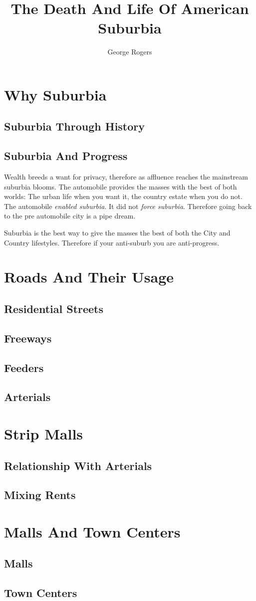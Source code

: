 \documentclass[8pt]{amsbook}
\title{The Death And Life Of American Suburbia}
\author{George Rogers}
\begin{document}
\dominitoc
\maketitle

\tableofcontents
\chapter{Why Suburbia}
\minitoc
\section{Suburbia Through History}
\section{Suburbia And Progress}
Wealth breeds a want for privacy,
therefore as affluence reaches the mainstream suburbia blooms.
The automobile provides the masses with the best of both worlds:
The urban life when you want it, the country estate when you do not.
The automobile \emph{enabled suburbia}. It did not \emph{force suburbia}.
Therefore going back to the pre automobile city is a pipe dream.

Suburbia is the best way to give the masses the best of both the City and Country lifestyles.
Therefore if your anti-suburb you are anti-progress.
\chapter{Roads And Their Usage}
\minitoc
\section{Residential Streets}
\section{Freeways}
\section{Feeders}
\section{Arterials}
\chapter{Strip Malls}
\minitoc
\section{Relationship With Arterials}
\section{Mixing Rents}
\chapter{Malls And Town Centers}
\minitoc
\section{Malls}
\section{Town Centers}
\end{document}
